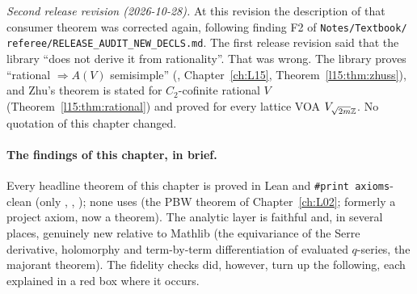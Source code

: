 \emph{Second release revision (2026-10-28).} At this revision the description of
that consumer theorem was corrected again, following finding F2 of \texttt{Notes/\allowbreak Textbook/\allowbreak
referee/\allowbreak RELEASE\_AUDIT\_NEW\_DECLS.md}. The first release revision said that the library ``does not derive it from
rationality''. That was wrong. The library proves ``rational $\Rightarrow A(V)$ semisimple''
(\allowbreak{}\allowbreak{}, Chapter~\ref{ch:L15},
Theorem~\ref{l15:thm:zhuss}), and Zhu's theorem is stated for $C_2$-cofinite rational $V$
(Theorem~\ref{l15:thm:rational}) and proved for every lattice VOA $V_{\sqrt{2m}{\mathbb{Z}}}$. No quotation of this chapter changed.

\paragraph{The findings of this chapter, in brief.} Every headline theorem of this chapter is proved in Lean and
\texttt{\#print axioms}-clean (only , , ); none uses  (the PBW theorem of Chapter~\ref{ch:L02}; formerly a project axiom, now a theorem). The analytic layer is faithful and, in several places, genuinely new relative to Mathlib (the
equivariance of the Serre derivative, holomorphy and term-by-term differentiation of evaluated $q$-series, the majorant
theorem). The fidelity checks did, however, turn up the following, each explained in a red box where it occurs.
